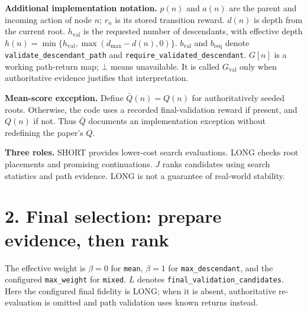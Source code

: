 \documentclass[11pt]{article}
\newcommand{\Gval}{G_{\mathrm{val}}}
\newcommand{\none}{\bot}
\newcommand{\MeanRoot}{\bar Q}
\newcommand{\depth}{d}
\begin{document}
\textbf{Additional implementation notation.}
$p(n)$ and $a(n)$ are the parent and incoming action of node $n$;
$r_n$ is its stored transition reward. $\depth(n)$ is depth from the current
root. $h_{\mathrm{val}}$ is the requested number of descendants, with effective
depth $h(n)=\min\{h_{\mathrm{val}},\max(d_{\max}-\depth(n),0)\}$.
$b_{\mathrm{val}}$ and $b_{\mathrm{req}}$ denote
\texttt{validate\_descendant\_path} and
\texttt{require\_validated\_descendant}.
$G[n]$ is a working path-return map; $\none$ means unavailable. It is called
$\Gval$ only when authoritative evidence justifies that interpretation.

\textbf{Mean-score exception.}
Define $\MeanRoot(n)=Q(n)$ for authoritatively seeded roots. Otherwise, the code uses
a recorded final-validation reward if present, and $Q(n)$ if not. Thus $\MeanRoot$
documents an implementation exception without redefining the paper's $Q$.

\textbf{Three roles.} SHORT provides lower-cost search evaluations. LONG
checks root placements and promising continuations. $J$ ranks candidates using
search statistics and path evidence. LONG is not a guarantee of real-world stability.

\newpage
\section*{2. Final selection: prepare evidence, then rank}
The effective weight is $\beta=0$ for \texttt{mean}, $\beta=1$ for
\texttt{max\_descendant}, and the configured \texttt{max\_weight} for
\texttt{mixed}. $L$ denotes \texttt{final\_validation\_candidates}.
Here the configured final fidelity is LONG; when it is absent, authoritative
re-evaluation is omitted and path validation uses known returns instead.
\end{document}
